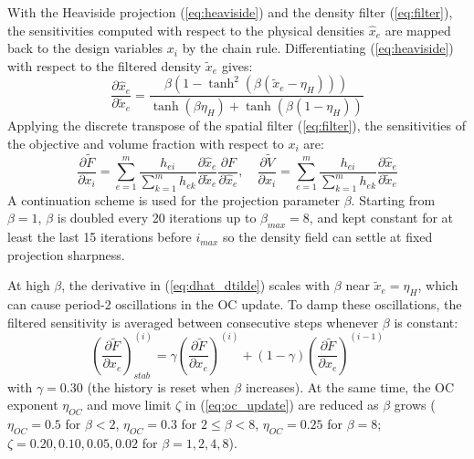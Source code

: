 \documentclass{article}
\begin{document}
\noindent With the Heaviside projection (\ref{eq:heaviside}) and the density filter (\ref{eq:filter}), the sensitivities computed with respect to the physical densities $\hat{x}_e$ are mapped back to the design variables $x_i$ by the chain rule. Differentiating (\ref{eq:heaviside}) with respect to the filtered density $\tilde{x}_e$ gives:
\begin{equation}\label{eq:dhat_dtilde}
\frac{\partial \hat{x}_e}{\partial \tilde{x}_e} = \frac{\beta \left(1 - \tanh^2(\beta(\tilde{x}_e - \eta_H))\right)}{\tanh(\beta\eta_H) + \tanh(\beta(1 - \eta_H))}
\end{equation}
Applying the discrete transpose of the spatial filter (\ref{eq:filter}), the sensitivities of the objective and volume fraction with respect to $x_i$ are:
\begin{equation}\label{eq:chain_rule}
\frac{\partial \tilde{F}}{\partial x_i} = \sum_{e=1}^{m} \frac{h_{ei}}{\sum_{k=1}^{m} h_{ek}} \frac{\partial \hat{x}_e}{\partial \tilde{x}_e} \frac{\partial F}{\partial \hat{x}_e}, \quad \frac{\partial \tilde{V}}{\partial x_i} = \sum_{e=1}^{m} \frac{h_{ei}}{\sum_{k=1}^{m} h_{ek}} \frac{\partial \hat{x}_e}{\partial \tilde{x}_e}
\end{equation}
A continuation scheme is used for the projection parameter $\beta$. Starting from $\beta = 1$, $\beta$ is doubled every 20 iterations up to $\beta_{max} = 8$, and kept constant for at least the last 15 iterations before $i_{max}$ so the density field can settle at fixed projection sharpness.

At high $\beta$, the derivative in (\ref{eq:dhat_dtilde}) scales with $\beta$ near $\tilde{x}_e = \eta_H$, which can cause period-2 oscillations in the OC update. To damp these oscillations, the filtered sensitivity is averaged between consecutive steps whenever $\beta$ is constant:
\begin{equation}\label{eq:sens_damping}
\left(\frac{\partial \tilde{F}}{\partial x_e}\right)^{(i)}_{stab} = \gamma \left(\frac{\partial \tilde{F}}{\partial x_e}\right)^{(i)} + (1 - \gamma) \left(\frac{\partial \tilde{F}}{\partial x_e}\right)^{(i-1)}
\end{equation}
with $\gamma = 0.30$ (the history is reset when $\beta$ increases). At the same time, the OC exponent $\eta_{OC}$ and move limit $\zeta$ in (\ref{eq:oc_update}) are reduced as $\beta$ grows ($\eta_{OC} = 0.5$ for $\beta < 2$, $\eta_{OC} = 0.3$ for $2 \leq \beta < 8$, $\eta_{OC} = 0.25$ for $\beta = 8$; $\zeta = 0.20, 0.10, 0.05, 0.02$ for $\beta = 1, 2, 4, 8$).
\end{document}
